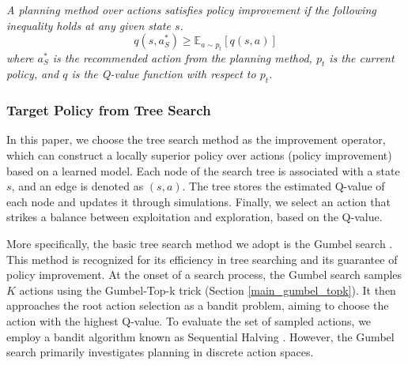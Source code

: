 \begin{definition}
\label{def:PI}
\textit{A planning method over actions satisfies policy improvement if the following inequality holds at any given state \( s \).}
\begin{equation}
\label{PI}
     q(s,a^*_{S}) \geq \mathbb{E}_{a \sim p_t}[q(s,a)]
\end{equation}
\textit{where \( a^*_S \) is the recommended action from the planning method, \( p_t \) is the current policy, and \( q \) is the Q-value function with respect to \( p_t \).}
\end{definition}


\subsubsection{Target Policy from Tree Search}



In this paper, we choose the tree search method as the improvement operator, which can construct a locally superior policy over actions (policy improvement) based on a learned model. Each node of the search tree is associated with a state \( s \), and an edge is denoted as \( (s,a) \). The tree stores the estimated Q-value of each node and updates it through simulations. Finally, we select an action that strikes a balance between exploitation and exploration, based on the Q-value.



More specifically, the basic tree search method we adopt is the Gumbel search \citep{danihelka2021policy}. This method is recognized for its efficiency in tree searching and its guarantee of policy improvement. At the onset of a search process, the Gumbel search samples \( K \) actions using the Gumbel-Top-k trick (Section \ref{main_gumbel_topk}). It then approaches the root action selection as a bandit problem, aiming to choose the action with the highest Q-value. To evaluate the set of sampled actions, we employ a bandit algorithm known as Sequential Halving \citep{karnin2013almost}. However, the Gumbel search primarily investigates planning in discrete action spaces.

